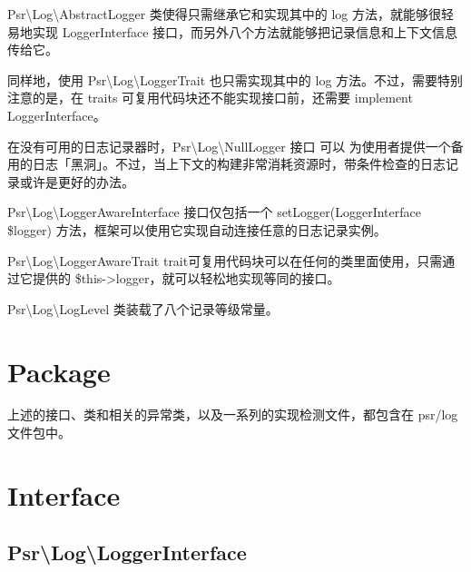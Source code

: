 \begin{compactitem}
\item Psr\textbackslash Log\textbackslash AbstractLogger 类使得只需继承它和实现其中的 log 方法，就能够很轻易地实现 LoggerInterface 接口，而另外八个方法就能够把记录信息和上下文信息传给它。

\item 同样地，使用 Psr\textbackslash Log\textbackslash LoggerTrait 也只需实现其中的 log 方法。不过，需要特别注意的是，在 traits 可复用代码块还不能实现接口前，还需要 implement LoggerInterface。

\item 在没有可用的日志记录器时，Psr\textbackslash Log\textbackslash NullLogger 接口 可以 为使用者提供一个备用的日志「黑洞」。不过，当上下文的构建非常消耗资源时，带条件检查的日志记录或许是更好的办法。

\item Psr\textbackslash Log\textbackslash LoggerAwareInterface 接口仅包括一个 setLogger(LoggerInterface \$logger) 方法，框架可以使用它实现自动连接任意的日志记录实例。

\item Psr\textbackslash Log\textbackslash LoggerAwareTrait trait可复用代码块可以在任何的类里面使用，只需通过它提供的 \$this->logger，就可以轻松地实现等同的接口。

\item Psr\textbackslash Log\textbackslash LogLevel 类装载了八个记录等级常量。

\end{compactitem}

\section{Package}

上述的接口、类和相关的异常类，以及一系列的实现检测文件，都包含在 psr/log 文件包中。

\section{Interface}

\subsection{Psr\textbackslash Log\textbackslash LoggerInterface}


